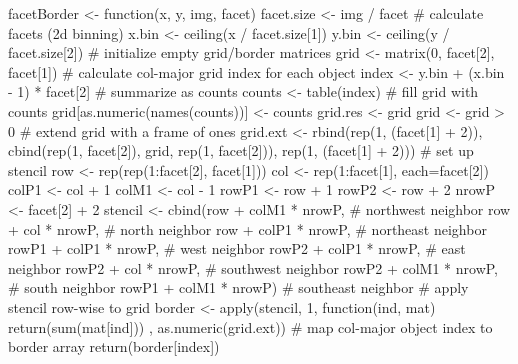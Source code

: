 

\begin{rcode}
facetBorder <- function(x, y, img, facet) {
  facet.size <- img / facet
  # calculate facets (2d binning)
  x.bin <- ceiling(x / facet.size[1])
  y.bin <- ceiling(y / facet.size[2])
  # initialize empty grid/border matrices
  grid <- matrix(0, facet[2], facet[1])
  # calculate col-major grid index for each object
  index <- y.bin + (x.bin - 1) * facet[2]
  # summarize as counts
  counts <- table(index)
  # fill grid with counts
  grid[as.numeric(names(counts))] <- counts
  grid.res <- grid
  grid <- grid > 0
  # extend grid with a frame of ones
  grid.ext <- rbind(rep(1, (facet[1] + 2)),
                    cbind(rep(1, facet[2]), grid, rep(1, facet[2])),
                    rep(1, (facet[1] + 2)))
  # set up stencil
  row <- rep(rep(1:facet[2], facet[1]))
  col <- rep(1:facet[1], each=facet[2])
  colP1 <- col + 1
  colM1 <- col - 1
  rowP1 <- row + 1
  rowP2 <- row + 2
  nrowP <- facet[2] + 2
  stencil <- cbind(row   + colM1 * nrowP, # northwest neighbor
                   row   + col   * nrowP, # north neighbor
                   row   + colP1 * nrowP, # northeast neighbor
                   rowP1 + colP1 * nrowP, # west neighbor
                   rowP2 + colP1 * nrowP, # east neighbor
                   rowP2 + col   * nrowP, # southwest neighbor
                   rowP2 + colM1 * nrowP, # south neighbor
                   rowP1 + colM1 * nrowP) # southeast neighbor
  # apply stencil row-wise to grid
  border <- apply(stencil, 1, function(ind, mat) {
    return(sum(mat[ind]))
  }, as.numeric(grid.ext))
  # map col-major object index to border array
  return(border[index])
}
\end{rcode}

